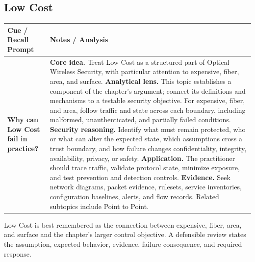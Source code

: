 \documentclass[11pt]{article}
\newcommand{\CornellHeader}{%
\rowcolor{Navy}\color{white}\bfseries Cue / Recall Prompt & \color{white}\bfseries Notes / Analysis\\\hline}
\newcommand{\CornellRow}[2]{%
\cellcolor{CueGray}\RaggedRight\textbf{#1} & \RaggedRight #2\\\hline}
\begin{document}
\subsection*{Low Cost}
\begin{longtable}{>{\RaggedRight\arraybackslash}p{}|>{\RaggedRight\arraybackslash}p{}}
\CornellHeader
\CornellRow{Why can Low Cost fail in practice?}{\textbf{Core idea.} Treat Low Cost as a structured part of Optical Wireless Security, with particular attention to expensive, fiber, area, and surface. \textbf{Analytical lens.} This topic establishes a component of the chapter's argument; connect its definitions and mechanisms to a testable security objective. For expensive, fiber, and area, follow traffic and state across each boundary, including malformed, unauthenticated, and partially failed conditions. \textbf{Security reasoning.} Identify what must remain protected, who or what can alter the expected state, which assumptions cross a trust boundary, and how failure changes confidentiality, integrity, availability, privacy, or safety. \textbf{Application.} The practitioner should trace traffic, validate protocol state, minimize exposure, and test prevention and detection controls. \textbf{Evidence.} Seek network diagrams, packet evidence, rulesets, service inventories, configuration baselines, alerts, and flow records. Related subtopics include Point to Point.}
\end{longtable}
\begin{topicsummary}
Low Cost is best remembered as the connection between expensive, fiber, area, and surface and the chapter's larger control objective. A defensible review states the assumption, expected behavior, evidence, failure consequence, and required response.
\end{topicsummary}
\end{document}
